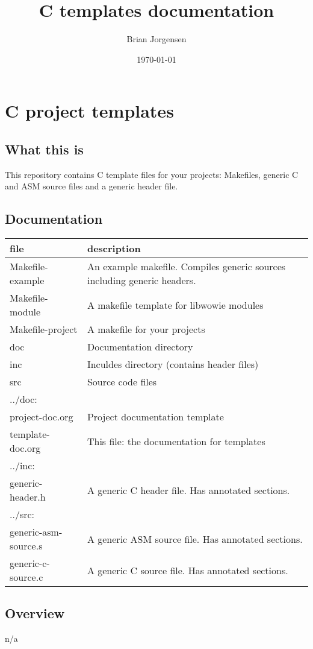 \documentclass[11pt]{article}
\author{Brian Jorgensen}
\date{\today}
\title{C templates documentation}
\begin{document}
\maketitle
\tableofcontents

\section{C project templates}
\label{sec:org69b74a4}
\subsection{What this is}
\label{sec:org4b69b2d}
This repository contains C template files for your projects: Makefiles,
generic C and ASM source files and a generic header file.
\subsection{Documentation}
\label{sec:orgca11c10}
\begin{center}
\begin{tabular}{ll}
file & description\\
\hline
Makefile-example & An example makefile. Compiles generic sources including generic headers.\\
Makefile-module & A makefile template for libwowie modules\\
Makefile-project & A makefile for your projects\\
doc & Documentation directory\\
inc & Inculdes directory (contains header files)\\
src & Source code files\\
\hline
../doc: & \\
project-doc.org & Project documentation template\\
template-doc.org & This file: the documentation for templates\\
\hline
../inc: & \\
generic-header.h & A generic C header file. Has annotated sections.\\
\hline
../src: & \\
generic-asm-source.s & A generic ASM source file. Has annotated sections.\\
generic-c-source.c & A generic C source file. Has annotated sections.\\
\end{tabular}
\end{center}

\subsection{Overview}
\label{sec:org6344d5d}
n/a
\end{document}

